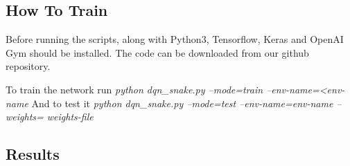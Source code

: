 \documentclass[conference,10pt]{IEEEtran}
\begin{document}
	\subsection{How To Train}
	
	Before running the scripts, along with Python3, Tensorflow, Keras and OpenAI Gym should be installed. The code can be downloaded from our github repository\cite{code}.
	
	To train the network run
	\break
	\break
	\textit{python dqn\_snake.py --mode=train --env-name=<env-name}
	\break
	\break
	And to test it
	\break
	\break
	\textit{ python dqn\_snake.py --mode=test --env-name=env-name --weights= weights-file}
	

	\subsection{Results}
	
\end{document}
